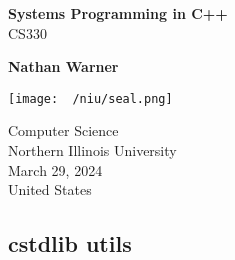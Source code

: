 \documentclass{report}
\title{\Huge{}}
\author{\huge{Nathan Warner}}
\date{\huge{}}
\begin{document}
        \begin{titlepage}
       \begin{center}
           \vspace*{1cm}
    
           \textbf{Systems Programming in C++} \\
           CS330
    
           \vspace{0.5cm}
            
                
           \vspace{1.5cm}
    
           \textbf{Nathan Warner}
    
           \vfill
                
                
           \vspace{0.8cm}
         
           \texttt{[image: ~/niu/seal.png]}
                
           Computer Science \\
           Northern Illinois University\\
           March 29, 2024 \\
           United States\\
           
                
       \end{center}
    \end{titlepage}
    \tableofcontents
    \pagebreak 
    \bigbreak \noindent 
    \subsection{cstdlib utils}
    \bigbreak \noindent 
\end{document}
